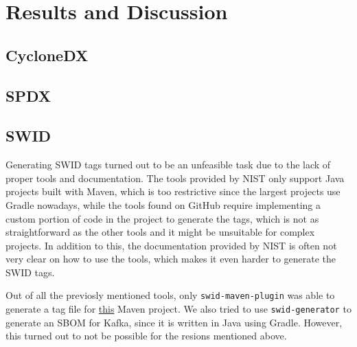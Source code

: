\section{Results and Discussion} \label{results}

\subsection{CycloneDX} \label{results:cdx}

\subsection{SPDX} \label{results:spdx}

\subsection{SWID} \label{results:swid}
Generating SWID tags turned out to be an unfeasible task due to the lack of proper tools and documentation. The tools provided by NIST only support Java projects built with Maven, which is too restrictive since the largest projects use Gradle nowadays, while the tools found on GitHub require implementing a custom portion of code in the project to generate the tags, which is not as straightforward as the other tools and it might be unsuitable for complex projects.
In addition to this, the documentation provided by NIST is often not very clear on how to use the tools, which makes it even harder to generate the SWID tags.

Out of all the previosly mentioned tools, only \verb|swid-maven-plugin| was able to generate a tag file for \href{https://github.com/MithunTechnologiesDevOps/maven-web-application}{this} Maven project.
We also tried to use \verb|swid-generator| to generate an SBOM for Kafka, since it is written in Java using Gradle. However, this turned out to not be possible for the resions mentioned above.
